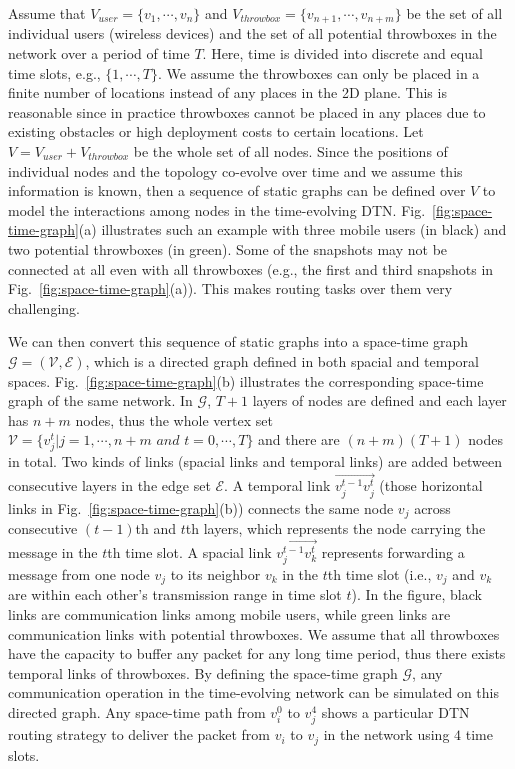 \documentclass[10pt,conference,compsocconf,letterpaper]{IEEEtran}
\begin{document}
Assume that $V_{user}= \{v_1,\cdots,v_n\}$ and $V_{throwbox}= \{v_{n+1},\cdots,v_{n+m}\}$ be the set of all individual
users (wireless devices) and the set of all potential throwboxes in the network over a period of time $T$.
Here, time is divided into discrete and equal time slots, e.g., $\{1,\cdots,T\}$.
We assume the throwboxes can only be placed in a finite number of locations instead of any places in the 2D plane.
This is reasonable since in practice throwboxes
cannot be placed in any places due to existing obstacles or high deployment costs to certain locations.
Let $V=V_{user}+V_{throwbox}$ be the whole set of all nodes.
Since the positions of individual nodes and the topology co-evolve over time and we assume this information is known, then a sequence of
static graphs can be defined over $V$ to model the interactions among nodes in
the time-evolving DTN. Fig.~\ref{fig:space-time-graph}(a)
illustrates such an example with three mobile users (in black) and two potential throwboxes (in green).
Some of the snapshots may not be connected at all even with all throwboxes (e.g., the first and third snapshots in
Fig.~\ref{fig:space-time-graph}(a)). This makes routing tasks over them very challenging.

We can then convert this sequence of static graphs into a space-time graph $\mathcal{G}=(\mathcal{V},\mathcal{E})$, which
is a directed graph defined in both spacial and temporal spaces. Fig.~\ref{fig:space-time-graph}(b) illustrates the corresponding
space-time graph of the same network. In  $\mathcal{G}$, $T+1$ layers of nodes are defined and each layer
has $n+m$ nodes, thus the whole vertex set $\mathcal{V}=\{v^t_j| j=1, \cdots, {n+m} \textit{ and } t=0,
\cdots, T\}$ and there are $(n+m)(T+1)$ nodes in total. Two kinds of links (spacial links and temporal links) are added between
consecutive layers in the edge set $\mathcal{E}$. A temporal link
$\overrightarrow{v^{t-1}_jv^{t}_j}$ (those horizontal links in
Fig.~\ref{fig:space-time-graph}(b)) connects the same node $v_j$ across
consecutive $(t-1)$th and $t$th layers, which represents the node
carrying the message in the $t$th time slot. A spacial link
$\overrightarrow{v^{t-1}_jv^{t}_k}$ represents forwarding a message
from one node $v_j$ to its neighbor $v_k$ in the $t$th time slot (i.e., $v_j$ and $v_k$ are
within each other's transmission range in time slot $t$). In the figure, black links are communication links among mobile users,
while green links are communication links with potential throwboxes. We assume that all throwboxes have the capacity to
buffer any packet for any long time period, thus there exists temporal links of throwboxes.
By defining the space-time graph $\mathcal{G}$, any communication operation in the
time-evolving network can be simulated on this directed graph. Any space-time
path from $v^0_i$ to $v^4_j$ shows a particular DTN routing strategy
to deliver the packet from $v_i$ to $v_j$ in the network using $4$
time slots.
\end{document}
